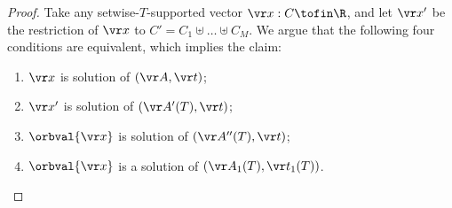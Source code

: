\begin{proof}
Take any setwise-$T$-supported vector $\vr x : C\tofin \R$, and
let $\vr x'$ be the restriction of $\vr x$ to $C' = C_1\uplus\ldots\uplus C_M$.
We argue that the following four conditions are equivalent, which implies the claim:

\begin{enumerate}
\item 
$\vr x$ is solution of $(\vr A, \vr t)$;
\item 
$\vr x'$ is solution of $(\vr A'(T), \vr t)$;
\item 
$\orbval{\vr x}$ is solution of $(\vr A''(T), \vr t)$;
\item
$\orbval {\vr x}$ is a solution of $(\vr A_1(T), \vr t_1(T))$.
\end{enumerate}


\end{proof}
